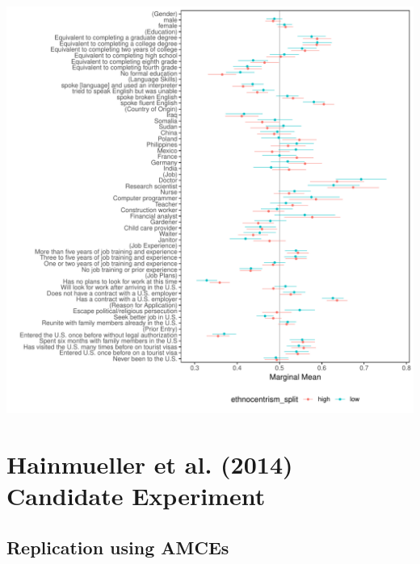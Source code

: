 \documentclass[a4paper,12pt]{article}\usepackage[]{graphicx}\usepackage[]{color}
\makeatletter
\def\maxwidth{ %
  \ifdim\Gin@nat@width>\linewidth
    \linewidth
  \else
    \Gin@nat@width
  \fi
}
\newenvironment{knitrout}{}{} %
\makeatother
\begin{document}
\begin{knitrout}
\color{fgcolor}
\includegraphics[width=\maxwidth]{figure/hainmueller_immigration_subgroup_mm_appendix-1} 

\end{knitrout}

\clearpage


\section{Hainmueller et al. (2014) Candidate Experiment}

\subsection{Replication using AMCEs}
\end{document}

